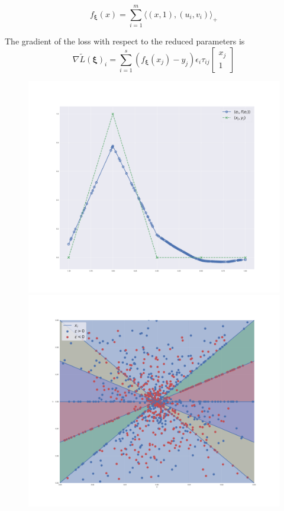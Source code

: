 \begin{equation}
    f_{\bm \xi}(x) = \sum_{i=1}^m \langle (x, 1), (u_i, v_i) \rangle_+ 
\end{equation}

The gradient of the loss with respect to the reduced parameters is 
\begin{equation}\label{eq:grad_reduced}
    \nabla \tilde{L}(\bm \xi)_i = \sum_{i=1}^s (f_{\bm \xi}(x_j) - y_j) \epsilon_i \tau_{ij} \begin{bmatrix}x_j \\ 1\end{bmatrix} 
\end{equation}

\begin{figure}
    \centering
        \includegraphics[width=\linewidth]{figures/reduced_gradient_recon.pdf}
    \endminipage
        \includegraphics[width=\linewidth]{figures/reduced_gradient_phase.pdf}

\end{figure}
